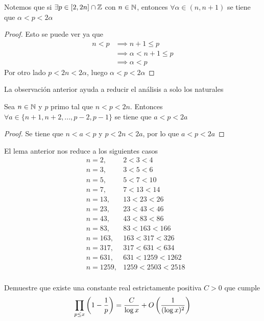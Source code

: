 \begin{sol}
	\begin{obs}
		Notemos que si $\exists p\in[2,2n]\cap\mathbb{Z}$ con $n\in\mathbb{N}$, entonces $\forall\alpha\in(n,n+1)$ se tiene que $\alpha<p<2\alpha$
		\begin{proof}
			Esto se puede ver ya que
			\begin{align*}
				n<p & \implies n+1\leq p       \\
				    & \implies\alpha<n+1\leq p \\
				    & \implies\alpha<p
			\end{align*}
			Por otro lado $p<2n<2\alpha$, luego $\alpha<p<2\alpha$
		\end{proof}
	\end{obs}
	{\flushleft La observación anterior ayuda a reducir el análisis a solo los naturales}
	\begin{lem}
		Sea $n\in\mathbb{N}$ y $p$ primo tal que $n<p<2n$. Entonces $\forall a\in\{n+1,n+2,...,p-2,p-1\}$ se tiene que $a<p<2a$
		\begin{proof}
			Se tiene que $n<a<p$ y $p<2n<2a$, por lo que $a<p<2a$
		\end{proof}
	\end{lem}
	{\flushleft El lema anterior nos reduce a los siguientes casos}
	\begin{align*}
		 & n=2,    & 2<3<4          \\
		 & n=3,    & 3<5<6          \\
		 & n=5,    & 5<7<10         \\
		 & n=7,    & 7<13<14        \\
		 & n=13,   & 13<23<26       \\
		 & n=23,   & 23<43<46       \\
		 & n=43,   & 43<83<86       \\
		 & n=83,   & 83<163<166     \\
		 & n=163,  & 163<317<326    \\
		 & n=317,  & 317<631<634    \\
		 & n=631,  & 631<1259<1262  \\
		 & n=1259, & 1259<2503<2518 \\
	\end{align*}

\end{sol}

\begin{prob}[4 pts.]
	Demuestre que existe una constante real estrictamente positiva $C>0$ que cumple
	\[\prod_{p\leq x}\left(1-\frac{1}{p}\right)=\frac{C}{\log x}+O\left(\frac{1}{(\log x)^2}\right)\]
\end{prob}

